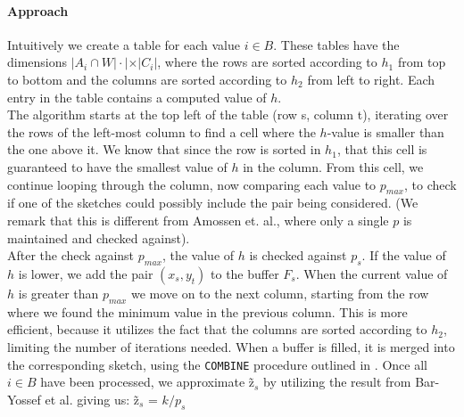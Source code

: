 \documentclass[a4paper,11pt]{article}
\begin{document}
\paragraph{Approach}
Intuitively we create a table for each value $i \in B$. These tables have the dimensions $|A_i\cap W|\cdot | \times |C_i|$, where the rows are sorted according to $h_1$ from top to bottom and the columns are sorted according to $h_2$ from left to right. Each entry in the table contains a computed value of $h$.\\

The algorithm starts at the top left of the table (row s, column t), iterating over the rows of the left-most column to find a cell where the $h$-value is smaller than the one above it. We know that since the row is sorted in $h_1$, that this cell is guaranteed to have the smallest value of $h$ in the column. From this cell, we continue looping through the column, now comparing each value to $p_{max}$, to check if one of the sketches could possibly include the pair being considered. (We remark that this is different from Amossen et. al., where only a single $p$ is maintained and checked against). \\

After the check against $p_{max}$, the value of $h$ is checked against $p_s$. If the value of $h$ is lower, we add the pair $(x_s, y_t)$ to the buffer $F_s$. When the current value of $h$ is greater than $p_{max}$ we move on to the next column, starting from the row where we found the minimum value in the previous column. This is more efficient, because it utilizes the fact that the columns are sorted according to $h_2$, limiting the number of iterations needed. When a buffer is filled, it is merged into the corresponding sketch, using the \texttt{COMBINE} procedure outlined in \cite{paper:amossen}. Once all $i \in B$ have been processed, we approximate \~{z}$_s$ by utilizing the result from Bar-Yossef et al. giving us: \~{z}$_s$ = $k/p_s$



\end{document}
